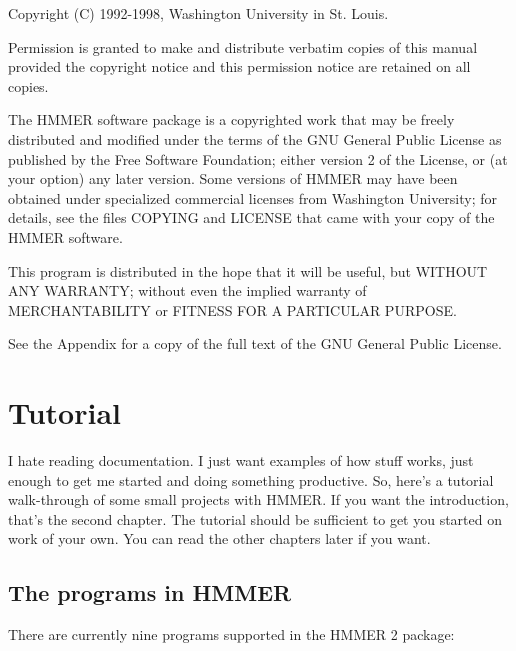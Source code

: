 \documentclass[11pt]{report}
\begin{document}
\vspace*{\fill}
\begin{flushleft}
Copyright (C) 1992-1998, Washington University in St. Louis.\vspace{5mm}

Permission is granted to make and distribute verbatim copies of this
manual provided the copyright notice and this permission notice are
retained on all copies.\vspace{5mm}

The HMMER software package is a copyrighted work that may be freely
distributed and modified under the terms of the GNU General Public
License as published by the Free Software Foundation; either version 2
of the License, or (at your option) any later version. Some versions
of HMMER may have been obtained under specialized commercial licenses
from Washington University; for details, see the files COPYING and
LICENSE that came with your copy of the HMMER software.\vspace{5mm}

This program is distributed in the hope that it will be useful, but
WITHOUT ANY WARRANTY; without even the implied warranty of
MERCHANTABILITY or FITNESS FOR A PARTICULAR PURPOSE.\vspace{5mm}

See the Appendix for a copy of the full text of the GNU General Public
License.\vspace{5mm}

\end{flushleft}

\tableofcontents

\chapter{Tutorial}

I hate reading documentation. I just want examples of how stuff works,
just enough to get me started and doing something productive. So,
here's a tutorial walk-through of some small projects with HMMER. If
you want the introduction, that's the second chapter. The tutorial
should be sufficient to get you started on work of your own. You can
read the other chapters later if you want.

\section {The programs in HMMER}

There are currently nine programs supported in the HMMER 2 package:
\end{document}
